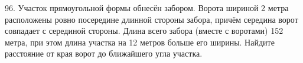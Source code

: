 96. Участок прямоугольной формы обнесён забором. Ворота шириной 2 метра расположены ровно посередине длинной стороны забора, причём середина ворот совпадает с серединой стороны. Длина всего забора (вместе с воротами) 152 метра, при этом длина участка на 12 метров больше его ширины. Найдите расстояние от края ворот до ближайшего угла участка.\\
